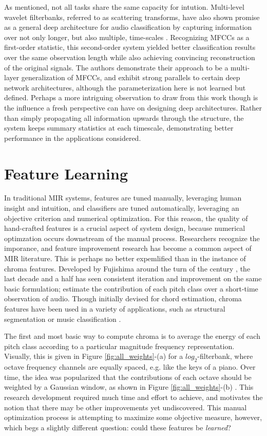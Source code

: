 As mentioned, not all tasks share the same capacity for intution.
Multi-level wavelet filterbanks, referred to as scattering transforms, have also shown promise as a general deep architecture for audio classification by capturing information over not only longer, but also multiple, time-scales \cite{Anden2011}.
Recognizing MFCCs as a first-order statistic, this second-order system yielded better classification results over the same observation length while also achieving convincing reconstruction of the original signals.
The authors demonstrate their approach to be a multi-layer generalization of MFCCs, and exhibit strong parallels to certain deep network architectures, although the parameterization here is not learned but defined.
Perhaps a more intriguing observation to draw from this work though is the influence a fresh perspective can have on designing deep architectures.
Rather than simply propagating all information upwards through the structure, the system keeps summary statistics at each timescale, demonstrating better performance in the applications considered.


\section{Feature Learning}

In traditional MIR systems, features are tuned manually, leveraging human insight and intuition, and classifiers are tuned automatically, leveraging an objective criterion and numerical optimization.
For this reason, the quality of hand-crafted features is a crucial aspect of system design, because numerical optimzation occurs downstream of the manual process.
Researchers recognize the imporance, and feature improvement research has become a common aspect of MIR literature.
This is perhaps no better expemlified than in the instance of chroma features.
Developed by Fujishima around the turn of the century \cite{Fujishima1999}, the last decade and a half has seen consistent iteration and improvement on the same basic formulation; estimate the contribution of each pitch class over a short-time observation of audio.
Though initially devised for chord estimation, chroma features have been used in a variety of applications, such as structural segmentation \cite{Levy2007} or music classification \cite{Mandel2005}.

The first and most basic way to compute chroma is to average the energy of each pitch class according to a particular magnitude frequency representation.
Visually, this is given in Figure \ref{fig:all_weights}-(a) for a $log_2$-filterbank, where octave frequency channels are equally spaced, e.g. like the keys of a piano.
Over time, the idea was popularized that the contributions of each octave should be weighted by a Gaussian window, as shown in Figure \ref{fig:all_weights}-(b) \cite{Cho2014}.
This research development required much time and effort to achieve, and motivates the notion that there may be other improvements yet undiscovered.
This manual optimization process is attempting to maximize some objective measure, however, which begs a slightly different question: could these features be \emph{learned}?

